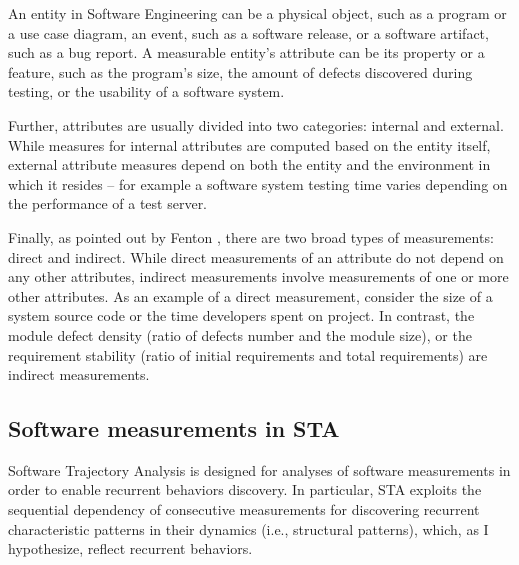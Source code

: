 An entity in Software Engineering can be a physical object, such as a program or a use case diagram, 
an event, such as a software release, or a software artifact, such as a bug report.
A measurable entity's attribute can be its property or a feature, such as the program's size, the 
amount of defects discovered during testing, or the usability of a software system.

Further, attributes are usually divided into two categories: internal and external. 
While measures for internal attributes are computed based on the entity itself, external attribute 
measures depend on both the entity and the environment in which it resides -- for example a 
software system testing time varies depending on the performance of a test server.

Finally, as pointed out by Fenton \cite{citeulike:1803429}, there are two broad types of measurements: direct
and indirect. While direct measurements of an attribute do not depend on any other attributes, 
indirect measurements involve measurements of one or more other attributes. 
As an example of a direct measurement, consider the size of a system source code or the time developers spent 
on project. In contrast, the module defect density (ratio of defects number and the module size), 
or the requirement stability (ratio of initial requirements and total requirements) are indirect measurements.

\subsection{Software measurements in STA}
Software Trajectory Analysis is designed for analyses of software measurements in order to enable 
recurrent behaviors discovery. In particular, STA exploits the sequential dependency of consecutive 
measurements for discovering recurrent characteristic patterns in their dynamics (i.e., structural patterns), 
which, as I hypothesize, reflect recurrent behaviors.

